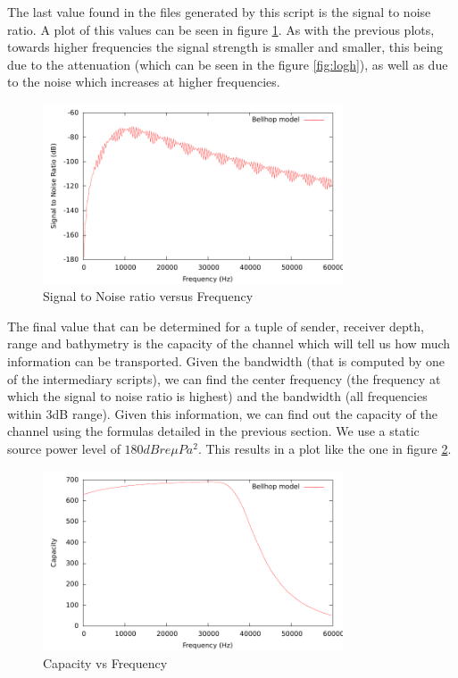 \documentclass[a4paper]{IEEEtran}
\begin{document}
The last value found in the files generated by this script is the
signal to noise ratio. A plot of this values can be seen in figure
\ref{fig:sig2noise}. As with the previous plots, towards higher
frequencies the signal strength is smaller and smaller, this being due
to the attenuation (which can be seen in the figure \ref{fig:logh}),
as well as due to the noise which increases at higher frequencies.

\begin{figure}[ht]
  \centering
  \includegraphics[width=3.5in]{../postprocessing/sig2noise00.pdf}
  \caption{\small{Signal to Noise ratio versus Frequency}}
  \label{fig:sig2noise}
\end{figure}

The final value that can be determined for a tuple of sender, receiver
depth, range and bathymetry is the capacity of the channel which will
tell us how much information can be transported. Given the bandwidth
(that is computed by one of the intermediary scripts), we can find the
center frequency (the frequency at which the signal to noise ratio is
highest) and the bandwidth (all frequencies within 3dB range). Given
this information, we can find out the capacity of the channel using
the formulas detailed in the previous section. We use a static source
power level of $180 dB re \mu Pa^2$. This results in a
plot like the one in figure \ref{fig:cap}. 

\begin{figure}[ht]
  \centering
  \includegraphics[width=3.5in]{../postprocessing/capacity00.pdf}
  \caption{\small{Capacity vs Frequency}}
  \label{fig:cap}
\end{figure}
\end{document}
